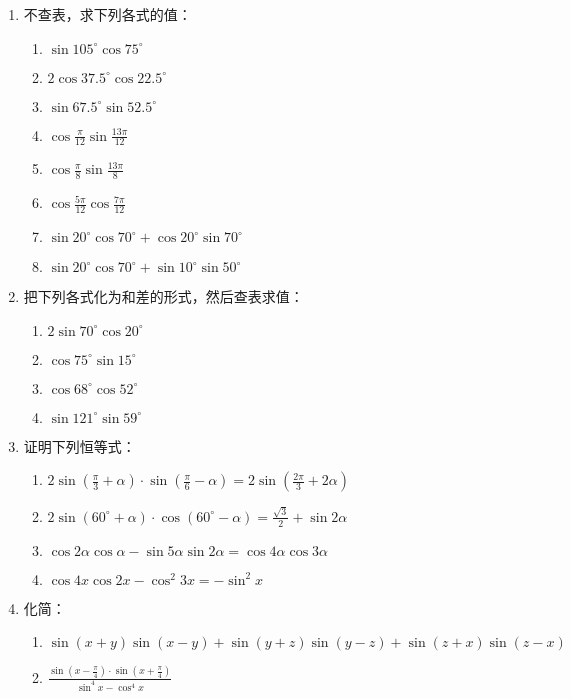 \begin{enumerate}
    \item 不查表，求下列各式的值：
\begin{multicols}{2}
\begin{enumerate}[(1)]
    \item $\sin105^{\circ}\cos75^{\circ}$
    \item $2\cos37.5^{\circ}\cos22.5^{\circ}$
    \item $\sin67.5^{\circ}\sin52.5^{\circ}$
    \item $\cos\frac{\pi}{12}\sin\frac{13\pi}{12}$
    \item $\cos\frac{\pi}{8}\sin\frac{13\pi}{8}$
    \item $\cos\frac{5\pi}{12}\cos\frac{7\pi}{12}$
    \item $\sin20^{\circ}\cos70^{\circ}+\cos20^{\circ}\sin70^{\circ}$
    \item $\sin20^{\circ}\cos70^{\circ}+\sin10^{\circ}\sin50^{\circ}$
\end{enumerate}
\end{multicols}

\item 把下列各式化为和差的形式，然后查表求值：
\begin{multicols}{2}
\begin{enumerate}[(1)]
    \item $2\sin70^{\circ}\cos20^{\circ}$
    \item $\cos75^{\circ}\sin15^{\circ}$
    \item $\cos68^{\circ}\cos52^{\circ}$
    \item $\sin121^{\circ}\sin59^{\circ}$
\end{enumerate}
\end{multicols}

\item 证明下列恒等式：
\begin{enumerate}[(1)]
    \item $2\sin\left(\frac{\pi}{3}+\alpha\right)\cdot \sin\left(\frac{\pi}{6}-\alpha\right)=2\sin\left(\frac{2\pi}{3}+2\alpha\right)$
    \item $2\sin(60^{\circ}+\alpha)\cdot \cos(60^{\circ}-\alpha)=\frac{\sqrt{3}}{2}+\sin2\alpha$
    \item $\cos2\alpha\cos\alpha-\sin5\alpha\sin2\alpha=\cos4\alpha\cos3\alpha$
    \item $\cos4x\cos2x-\cos^2 3x=-\sin^2 x$
\end{enumerate}

\item 化简：
\begin{enumerate}[(1)]
    \item $\sin(x+y)\sin(x-y)+\sin(y+z)\sin(y-z)+\sin(z+x)\sin(z-x)$
    \item $\frac{\sin\left(x-\frac{\pi}{4}\right)\cdot \sin\left(x+\frac{\pi}{4}\right)}{\sin^4 x-\cos^4 x}$
\end{enumerate}


\end{enumerate}
